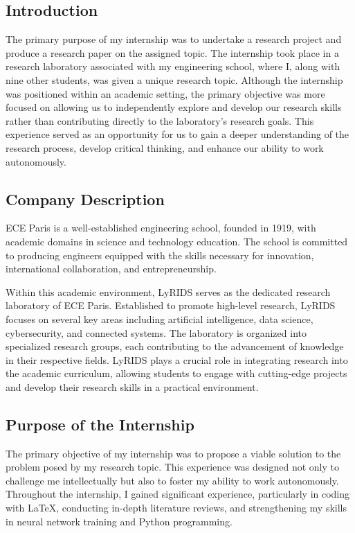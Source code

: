 \subsection{Introduction}\label{subsec:introduction}
The primary purpose of my internship was to undertake a research project and produce a research paper on the assigned
topic.
The internship took place in a research laboratory associated with my engineering school, where I, along with
nine other students, was given a unique research topic.
Although the internship was positioned within an academic setting, the primary objective was more focused on
allowing us to independently explore and develop our research skills rather than contributing directly to the
laboratory's research goals.
This experience served as an opportunity for us to gain a deeper understanding of the research process, develop critical
thinking, and enhance our ability to work autonomously.

\subsection{Company Description}\label{subsec:company-description}
ECE Paris is a well-established engineering school, founded in 1919, with academic domains in science and technology
education.
The school is committed to producing engineers equipped with the skills necessary for innovation, international
collaboration, and entrepreneurship.

Within this academic environment, LyRIDS serves as the dedicated research laboratory of ECE Paris.
Established to promote high-level research, LyRIDS focuses on several key areas including artificial intelligence, data
science, cybersecurity, and connected systems.
The laboratory is organized into specialized research groups, each contributing to the advancement of knowledge in their
respective fields.
LyRIDS plays a crucial role in integrating research into the academic curriculum, allowing students to engage with
cutting-edge projects and develop their research skills in a practical environment.

\subsection{Purpose of the Internship}\label{subsec:purpose-of-the-internship}
The primary objective of my internship was to propose a viable solution to the problem posed by my research topic.
This experience was designed not only to challenge me intellectually but also to foster my ability to work autonomously.
Throughout the internship, I gained significant experience, particularly in coding with \LaTeX{}, conducting
in-depth literature reviews, and strengthening my skills in neural network training and Python programming.

